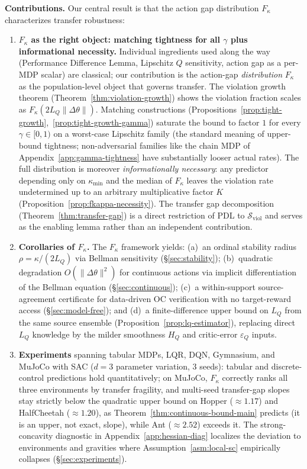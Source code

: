 \documentclass{article}
\newcommand{\Sviol}{\mathcal{S}_{\mathrm{viol}}}
\begin{document}
\textbf{Contributions.} Our central result is that the action gap distribution $F_\kappa$ characterizes transfer robustness:
\begin{enumerate}[leftmargin=*,itemsep=1pt,topsep=2pt]
\item \textbf{$F_\kappa$ as the right object: matching tightness for all $\gamma$ plus informational necessity.} Individual ingredients used along the way (Performance Difference Lemma, Lipschitz $Q$ sensitivity, action gap as a per-MDP scalar) are classical; our contribution is the action-gap \emph{distribution} $F_\kappa$ as the population-level object that governs transfer. The violation growth theorem (Theorem~\ref{thm:violation-growth}) shows the violation fraction scales as $F_\kappa(2L_Q\|\Delta\theta\|)$. Matching constructions (Propositions~\ref{prop:tight-growth},~\ref{prop:tight-growth-gamma}) saturate the bound to factor $1$ for every $\gamma \in [0,1)$ on a worst-case Lipschitz family (the standard meaning of upper-bound tightness; non-adversarial families like the chain MDP of Appendix~\ref{app:gamma-tightness} have substantially looser actual rates). The full distribution is moreover \emph{informationally necessary}: any predictor depending only on $\kappa_{\min}$ and the median of $F_\kappa$ leaves the violation rate undetermined up to an arbitrary multiplicative factor $K$ (Proposition~\ref{prop:fkappa-necessity}). The transfer gap decomposition (Theorem~\ref{thm:transfer-gap}) is a direct restriction of PDL to $\Sviol$ and serves as the enabling lemma rather than an independent contribution.
\item \textbf{Corollaries of $F_\kappa$.} The $F_\kappa$ framework yields: (a)~an ordinal stability radius $\rho = \kappa/(2L_Q)$ via Bellman sensitivity (\S\ref{sec:stability}); (b)~quadratic degradation $O(\|\Delta\theta\|^2)$ for continuous actions via implicit differentiation of the Bellman equation (\S\ref{sec:continuous}); (c)~a within-support source-agreement certificate for data-driven OC verification with no target-reward access (\S\ref{sec:model-free}); and (d)~a finite-difference upper bound on $L_Q$ from the same source ensemble (Proposition~\ref{prop:lq-estimator}), replacing direct $L_Q$ knowledge by the milder smoothness $H_Q$ and critic-error $\varepsilon_Q$ inputs.
\item \textbf{Experiments} spanning tabular MDPs, LQR, DQN, Gymnasium, and MuJoCo with SAC ($d=3$ parameter variation, 3 seeds): tabular and discrete-control predictions hold quantitatively; on MuJoCo, $F_\kappa$ correctly ranks all three environments by transfer fragility, and multi-seed transfer-gap slopes stay strictly below the quadratic upper bound on Hopper ($\approx 1.17$) and HalfCheetah ($\approx 1.20$), as Theorem~\ref{thm:continuous-bound-main} predicts (it is an upper, not exact, slope), while Ant ($\approx 2.52$) exceeds it. The strong-concavity diagnostic in Appendix~\ref{app:hessian-diag} localizes the deviation to environments and gravities where Assumption~\ref{asm:local-sc} empirically collapses (\S\ref{sec:experiments}).
\end{enumerate}
\end{document}
